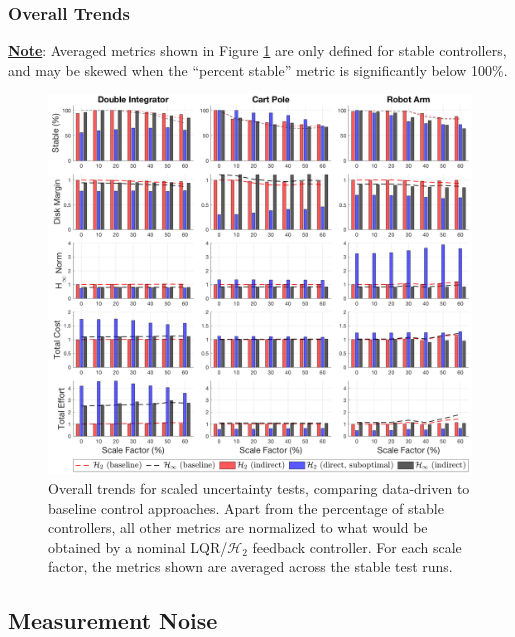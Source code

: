 \subsubsection{Overall Trends}
\underline{\textbf{Note}}: Averaged metrics shown in Figure \ref{fig:overall_trends_uncertainty_subopt_bar} are only defined for stable controllers, and may be skewed when the ``percent stable'' metric is significantly below 100\%.
\begin{figure}[H]
\centering
	\includegraphics[width=\textwidth]{figures/overall_trends_uncertainty_subopt_bar.png}
\caption{Overall trends for scaled uncertainty tests, comparing data-driven to baseline control approaches.  Apart from the percentage of stable controllers, all other metrics are normalized to what would be obtained by a nominal LQR/$\mathcal{H}_{2}$ feedback controller.  For each scale factor, the metrics shown are averaged across the stable test runs.}
\label{fig:overall_trends_uncertainty_subopt_bar}
\end{figure}

\newpage
\subsection{Measurement Noise}
